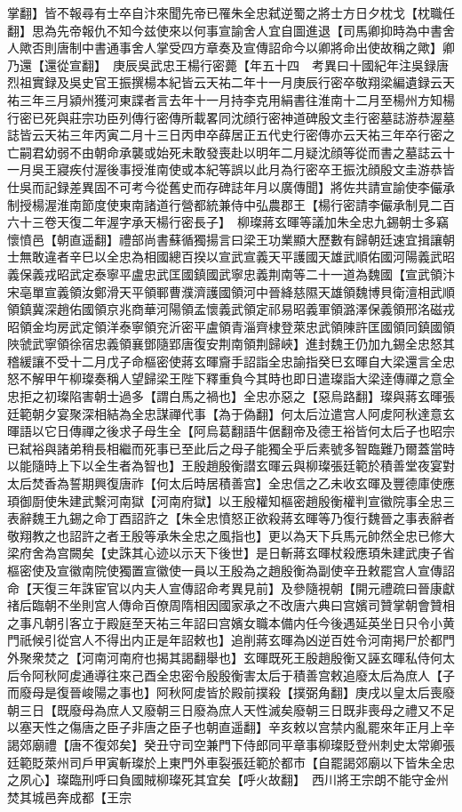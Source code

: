 掌翻】皆不報尋有士卒自汴來聞先帝已罹朱全忠弑逆蜀之將士方日夕枕戈【枕職任翻】思為先帝報仇不知今兹使來以何事宣諭舍人宜自圖進退【司馬卿抑時為中書舍人歟否則唐制中書通事舍人掌受四方章奏及宣傳詔命今以卿將命出使故稱之歟】卿乃還【還從宣翻】　庚辰吳武忠王楊行密薨【年五十四　考異曰十國紀年注吳録唐烈祖實録及吳史官王振撰楊本紀皆云天祐二年十一月庚辰行密卒敬翔梁編遺録云天祐三年三月潁州獲河東諜者言去年十一月持李克用絹書往淮南十二月至楊州方知楊行密已死與莊宗功臣列傳行密傳所載畧同沈顔行密神道碑殷文圭行密墓誌游恭渥墓誌皆云天祐三年丙寅二月十三日丙申卒薛居正五代史行密傳亦云天祐三年卒行密之亡嗣君幼弱不由朝命承襲或始死未敢發喪赴以明年二月疑沈顔等從而書之墓誌云十一月吳王寢疾付渥後事授淮南使或本紀等誤以此月為行密卒王振沈顔殷文圭游恭皆仕吳而記録差異固不可考今從舊史而存碑誌年月以廣傳聞】將佐共請宣諭使李儼承制授楊渥淮南節度使東南諸道行營都統兼侍中弘農郡王【楊行密請李儼承制見二百六十三卷天復二年渥字承天楊行密長子】　柳璨蔣玄暉等議加朱全忠九錫朝士多竊懷憤邑【朝直遥翻】禮部尚書蘇循獨揚言曰梁王功業顯大歷數有歸朝廷速宜揖讓朝士無敢違者辛巳以全忠為相國總百揆以宣武宣義天平護國天雄武順佑國河陽義武昭義保義戎昭武定泰寧平盧忠武匡國鎮國武寧忠義荆南等二十一道為魏國【宣武領汴宋亳單宣義領汝鄭滑天平領鄆曹濮濟護國領河中晉絳慈隰天雄領魏博貝衛澶相武順領鎮冀深趙佑國領京兆商華河陽領孟懷義武領定祁易昭義軍領潞澤保義領邢洺磁戎昭領金均房武定領洋泰寧領兖沂密平盧領青淄齊棣登萊忠武領陳許匡國領同鎮國領陜虢武寧領徐宿忠義領襄鄧隨郢唐復安荆南領荆歸峽】進封魏王仍加九錫全忠怒其稽緩讓不受十二月戊子命樞密使蔣玄暉齎手詔詣全忠諭指癸巳玄暉自大梁還言全忠怒不解甲午柳璨奏稱人望歸梁王陛下釋重負今其時也即日遣璨詣大梁逹傳禪之意全忠拒之初璨陷害朝士過多【謂白馬之禍也】全忠亦惡之【惡烏路翻】璨與蔣玄暉張廷範朝夕宴聚深相結為全忠謀禪代事【為于偽翻】何太后泣遣宫人阿䖍阿秋達意玄暉語以它日傳禪之後求子母生全【阿烏葛翻語牛倨翻帝及德王裕皆何太后子也昭宗已弑裕與諸弟稍長相繼而死事已至此后之母子能獨全乎后素號多智臨難乃爾蓋當時以能隨時上下以全生者為智也】王殷趙殷衡譛玄暉云與柳璨張廷範於積善堂夜宴對太后焚香為誓期興復唐祚【何太后時居積善宫】全忠信之乙未收玄暉及豐德庫使應頊御㕑使朱建武繫河南獄【河南府獄】以王殷權知樞密趙殷衡權判宣徽院事全忠三表辭魏王九錫之命丁酉詔許之【朱全忠憤怒正欲殺蔣玄暉等乃復行魏晉之事表辭者敬翔教之也詔許之者王殷等承朱全忠之風指也】更以為天下兵馬元帥然全忠已修大梁府舍為宫闕矣【史誅其心迹以示天下後世】是日斬蔣玄暉杖殺應頊朱建武庚子省樞密使及宣徽南院使獨置宣徽使一員以王殷為之趙殷衡為副使辛丑敕罷宫人宣傳詔命【天復三年誅宦官以内夫人宣傳詔命考異見前】及參隨視朝【開元禮疏曰晉康獻禇后臨朝不坐則宫人傳命百僚周隋相因國家承之不改唐六典曰宫嬪司贊掌朝會贊相之事凡朝引客立于殿庭至天祐三年詔曰宫嬪女職本備内任今後遇延英坐日只令小黄門祇候引從宫人不得出内正是年詔敕也】追削蔣玄暉為凶逆百姓令河南掲尸於都門外聚衆焚之【河南河南府也揭其謁翻舉也】玄暉既死王殷趙殷衡又誣玄暉私侍何太后令阿秋阿䖍通導往來己酉全忠密令殷殷衡害太后于積善宫敕追廢太后為庶人【子而廢母是復晉峻陽之事也】阿秋阿䖍皆於殿前撲殺【撲弼角翻】庚戌以皇太后喪廢朝三日【既廢母為庶人又廢朝三日廢為庶人天性滅矣廢朝三日既非喪母之禮又不足以塞天性之傷唐之臣子非唐之臣子也朝直遥翻】辛亥敕以宫禁内亂罷來年正月上辛謁郊廟禮【唐不復郊矣】癸丑守司空兼門下侍郎同平章事柳璨貶登州刺史太常卿張廷範貶萊州司戶甲寅斬璨於上東門外車裂張廷範於都市【自罷謁郊廟以下皆朱全忠之夙心】璨臨刑呼曰負國賊柳璨死其宜矣【呼火故翻】　西川將王宗朗不能守金州焚其城邑奔成都【王宗